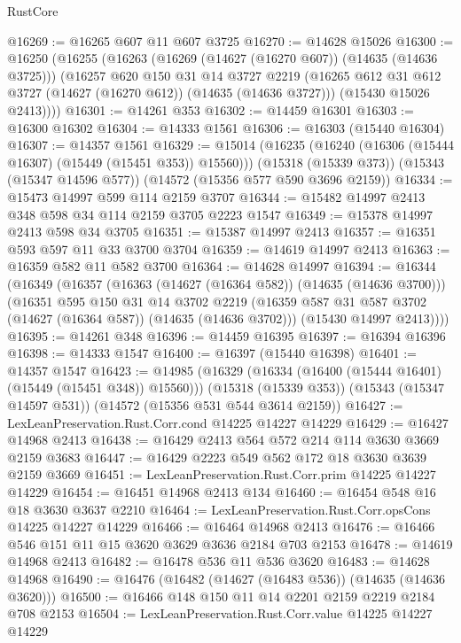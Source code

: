 \begin{lexlean}{RustCore}
\begin{coremodule}
@16269 := @16265 @607 @11 @607 @3725
@16270 := @14628 @15026
@16300 := @16250
    (@16255
      (@16263
        (@16269 (@14627 (@16270 @607)) (@14635 (@14636 @3725)))
        (@16257
          @620
          @150
          @31
          @14
          @3727
          @2219
          (@16265 @612 @31 @612 @3727 (@14627 (@16270 @612)) (@14635 (@14636 @3727)))
          (@15430 @15026 @2413))))
@16301 := @14261 @353
@16302 := @14459 @16301
@16303 := @16300 @16302
@16304 := @14333 @1561
@16306 := @16303 (@15440 @16304)
@16307 := @14357 @1561
@16329 := @15014
    (@16235 (@16240 (@16306 (@15444 @16307) (@15449 (@15451 @353)) @15560)))
    (@15318 (@15339 @373))
    (@15343 (@15347 @14596 @577))
    (@14572 (@15356 @577 @590 @3696 @2159))
@16334 := @15473 @14997 @599 @114 @2159 @3707
@16344 := @15482 @14997 @2413 @348 @598 @34 @114 @2159 @3705 @2223 @1547
@16349 := @15378 @14997 @2413 @598 @34 @3705
@16351 := @15387 @14997 @2413
@16357 := @16351 @593 @597 @11 @33 @3700 @3704
@16359 := @14619 @14997 @2413
@16363 := @16359 @582 @11 @582 @3700
@16364 := @14628 @14997
@16394 := @16344
    (@16349
      (@16357
        (@16363 (@14627 (@16364 @582)) (@14635 (@14636 @3700)))
        (@16351
          @595
          @150
          @31
          @14
          @3702
          @2219
          (@16359 @587 @31 @587 @3702 (@14627 (@16364 @587)) (@14635 (@14636 @3702)))
          (@15430 @14997 @2413))))
@16395 := @14261 @348
@16396 := @14459 @16395
@16397 := @16394 @16396
@16398 := @14333 @1547
@16400 := @16397 (@15440 @16398)
@16401 := @14357 @1547
@16423 := @14985
    (@16329 (@16334 (@16400 (@15444 @16401) (@15449 (@15451 @348)) @15560)))
    (@15318 (@15339 @353))
    (@15343 (@15347 @14597 @531))
    (@14572 (@15356 @531 @544 @3614 @2159))
@16427 := LexLeanPreservation.Rust.Corr.cond @14225 @14227 @14229
@16429 := @16427 @14968 @2413
@16438 := @16429 @2413 @564 @572 @214 @114 @3630 @3669 @2159 @3683
@16447 := @16429 @2223 @549 @562 @172 @18 @3630 @3639 @2159 @3669
@16451 := LexLeanPreservation.Rust.Corr.prim @14225 @14227 @14229
@16454 := @16451 @14968 @2413 @134
@16460 := @16454 @548 @16 @18 @3630 @3637 @2210
@16464 := LexLeanPreservation.Rust.Corr.opsCons @14225 @14227 @14229
@16466 := @16464 @14968 @2413
@16476 := @16466 @546 @151 @11 @15 @3620 @3629 @3636 @2184 @703 @2153
@16478 := @14619 @14968 @2413
@16482 := @16478 @536 @11 @536 @3620
@16483 := @14628 @14968
@16490 := @16476 (@16482 (@14627 (@16483 @536)) (@14635 (@14636 @3620)))
@16500 := @16466 @148 @150 @11 @14 @2201 @2159 @2219 @2184 @708 @2153
@16504 := LexLeanPreservation.Rust.Corr.value @14225 @14227 @14229

\end{coremodule}
\end{lexlean}
